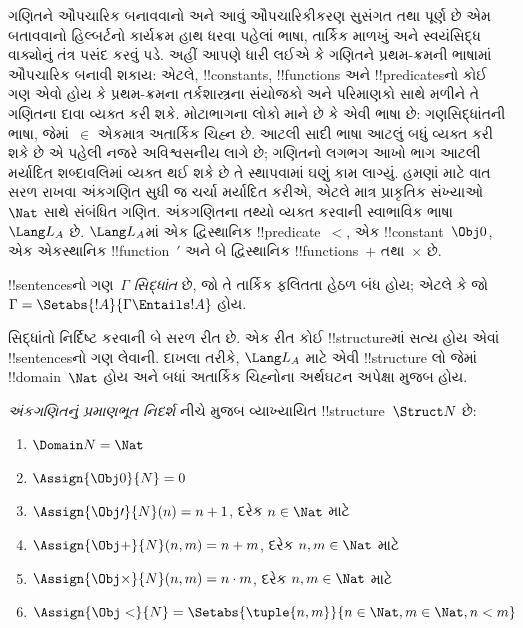 \documentclass[../../../include/open-logic-section]{subfiles}
\begin{document}


ગણિતને ઔપચારિક બનાવવાનો અને આવું ઔપચારિકીકરણ
સુસંગત તથા પૂર્ણ છે એમ બતાવવાનો હિલ્બર્ટનો
કાર્યક્રમ હાથ ધરવા પહેલાં ભાષા, તાર્કિક માળખું
અને સ્વયંસિદ્ધ વાક્યોનું તંત્ર પસંદ કરવું પડે.
અહીં આપણે ધારી લઈએ કે ગણિતને પ્રથમ-ક્રમની
ભાષામાં ઔપચારિક બનાવી શકાય: એટલે, !!{constant}s,
!!{function}s અને !!{predicate}sનો કોઈ ગણ એવો
હોય કે પ્રથમ-ક્રમના તર્કશાસ્ત્રના સંયોજકો અને
પરિમાણકો સાથે મળીને તે ગણિતના દાવા વ્યક્ત
કરી શકે. મોટાભાગના લોકો માને છે કે એવી ભાષા
છે: ગણસિદ્ધાંતની ભાષા, જેમાં~$\in$ એકમાત્ર
અતાર્કિક ચિહ્ન છે. આટલી સાદી ભાષા આટલું બધું
વ્યક્ત કરી શકે છે એ પહેલી નજરે અવિશ્વસનીય
લાગે છે; ગણિતનો લગભગ આખો ભાગ આટલી
મર્યાદિત શબ્દાવલિમાં વ્યક્ત થઈ શકે છે તે
સ્થાપવામાં ઘણું કામ લાગ્યું. હમણાં માટે વાત
સરળ રાખવા અંકગણિત સુધી જ ચર્ચા મર્યાદિત
કરીએ, એટલે માત્ર પ્રાકૃતિક સંખ્યાઓ~$\Nat$
સાથે સંબંધિત ગણિત. અંકગણિતના તથ્યો વ્યક્ત
કરવાની સ્વાભાવિક ભાષા~$\Lang L_A$ છે. $\Lang L_A$માં
એક દ્વિસ્થાનિક !!{predicate}~$<$, એક
!!{constant}~$\Obj 0$, એક એકસ્થાનિક
!!{function}~$\prime$ અને બે દ્વિસ્થાનિક
!!{function}s~$+$ તથા~$\times$ છે.

\begin{defn}
!!{sentence}sનો ગણ~$\Gamma$ \emph{સિદ્ધાંત} છે, જો
તે તાર્કિક ફલિતતા હેઠળ બંધ હોય; એટલે કે જો
$\Gamma = \Setabs{!A}{\Gamma \Entails
!A}$ હોય.
\end{defn}

સિદ્ધાંતો નિર્દિષ્ટ કરવાની બે સરળ રીત છે. એક
રીત કોઈ !!{structure}માં સત્ય હોય એવાં
!!{sentence}sનો ગણ લેવાની. દાખલા તરીકે,
$\Lang L_A$ માટે એવી !!{structure} લો જેમાં
!!{domain}~$\Nat$ હોય અને બધાં અતાર્કિક
ચિહ્નોના અર્થઘટન અપેક્ષા મુજબ હોય.

\begin{defn}
\emph{અંકગણિતનું પ્રમાણભૂત નિદર્શ} નીચે મુજબ
વ્યાખ્યાયિત !!{structure}~$\Struct N$ છે:
\begin{enumerate}
\item $\Domain N = \Nat$
\item $\Assign{\Obj 0}{N} = 0$
\item $\Assign{\Obj \prime}{N}(n) = n + 1$, દરેક $n \in \Nat$ માટે
\item $\Assign{\Obj +}{N}(n, m) = n + m$, દરેક $n, m \in \Nat$ માટે
\item $\Assign{\Obj \times}{N}(n, m) = n\cdot m$, દરેક $n, m \in \Nat$ માટે
\item $\Assign{\Obj <}{N} = \Setabs{\tuple{n, m}}{n \in \Nat, m \in
  \Nat, n < m}$
\end{enumerate}
\end{defn}
\end{document}
